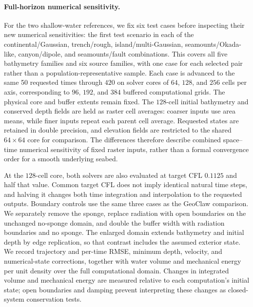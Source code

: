 \paragraph{Full-horizon numerical sensitivity.}
For the two shallow-water references, we fix six test cases before inspecting their new numerical sensitivities: the first test scenario in each of the continental/Gaussian, trench/rough, island/multi-Gaussian, seamounts/Okada-like, canyon/dipole, and seamounts/fault combinations. This covers all five bathymetry families and six source families, with one case for each selected pair rather than a population-representative sample. Each case is advanced to the same 50 requested times through $420$ on solver cores of $64$, $128$, and $256$ cells per axis, corresponding to $96$, $192$, and $384$ buffered computational grids. The physical core and buffer extents remain fixed. The $128$-cell initial bathymetry and conserved depth fields are held as raster cell averages: coarser inputs use area means, while finer inputs repeat each parent cell average. Requested states are retained in double precision, and elevation fields are restricted to the shared $64 \times 64$ core for comparison. The differences therefore describe combined space--time numerical sensitivity of fixed raster inputs, rather than a formal convergence order for a smooth underlying seabed.

At the $128$-cell core, both solvers are also evaluated at target CFL $0.1125$ and half that value. Common target CFL does not imply identical natural time steps, and halving it changes both time integration and interpolation to the requested outputs. Boundary controls use the same three cases as the GeoClaw comparison. We separately remove the sponge, replace radiation with open boundaries on the unchanged no-sponge domain, and double the buffer width with radiation boundaries and no sponge. The enlarged domain extends bathymetry and initial depth by edge replication, so that contrast includes the assumed exterior state. We record trajectory and per-time RMSE, minimum depth, velocity, and numerical-state corrections, together with water volume and mechanical energy per unit density over the full computational domain. Changes in integrated volume and mechanical energy are measured relative to each computation's initial state; open boundaries and damping prevent interpreting these changes as closed-system conservation tests.

